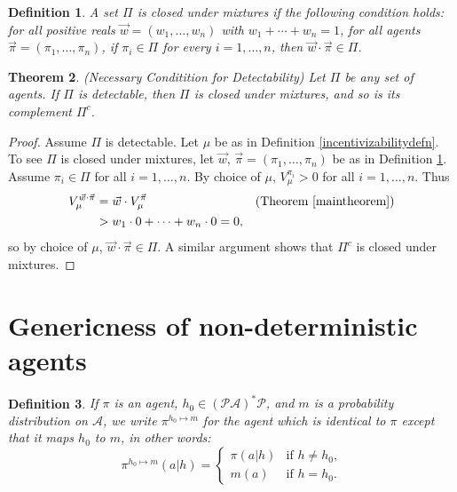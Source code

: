 \documentclass[twoside]{article}
\newtheorem{theorem}{Theorem}
\newtheorem{definition}[theorem]{Definition}
\begin{document}
\begin{definition}
\label{mixtureclosuredef}
    A set $\Pi$ is \emph{closed under mixtures} if the following
    condition holds: for all positive reals $\vec w=(w_1,\ldots,w_n)$
    with $w_1+\cdots+w_n=1$,
    for all agents $\vec\pi=(\pi_1,\ldots,\pi_n)$,
    if $\pi_i\in \Pi$ for every $i=1,\ldots,n$, then
    $\vec w\cdot\vec\pi\in\Pi$.
\end{definition}

\begin{theorem}
\label{closuretheorem}
    (Necessary Conditition for Detectability)
    Let $\Pi$ be any set of agents.
    If $\Pi$ is detectable, then $\Pi$ is closed under mixtures, and so
    is its complement $\Pi^c$.
\end{theorem}

\begin{proof}
    Assume $\Pi$ is detectable.
    Let $\mu$ be as in
    Definition \ref{incentivizabilitydefn}.
    To see $\Pi$ is closed under mixtures, let $\vec w$, $\vec\pi=(\pi_1,\ldots,\pi_n)$ be
    as in Definition \ref{mixtureclosuredef}.
    Assume $\pi_i\in\Pi$ for all $i=1,\ldots,n$.
    By choice of $\mu$, $V^{\pi_i}_\mu>0$ for all $i=1,\ldots,n$.
    Thus
    \begin{align*}
        V^{\vec w\cdot\vec\pi}_\mu
            &= \vec w\cdot V^{\vec\pi}_\mu
                &\mbox{(Theorem \ref{maintheorem})}\\
            &> w_1\cdot 0 + \cdots + w_n\cdot 0 = 0,
    \end{align*}
    so by choice of $\mu$, $\vec w\cdot \vec\pi\in \Pi$.
    A similar argument shows that $\Pi^c$ is closed under mixtures.
\end{proof}


\section{Genericness of non-deterministic agents}

\begin{definition}
\label{modifyagentatoneplace}
    If $\pi$ is an agent, $h_0\in(\mathcal P\mathcal A)^*\mathcal P$,
    and $m$ is a probability distribution on $\mathcal A$,
    we write $\pi^{h_0\mapsto m}$ for the agent which is identical to $\pi$
    except that it maps $h_0$ to $m$, in other words:
    \[
        \pi^{h_0\mapsto m}(a|h)
        =
        \begin{cases}
            \pi(a|h) &\mbox{if $h\not=h_0$,}\\
            m(a) &\mbox{if $h=h_0$.}
        \end{cases}
    \]
\end{definition}
\end{document}
